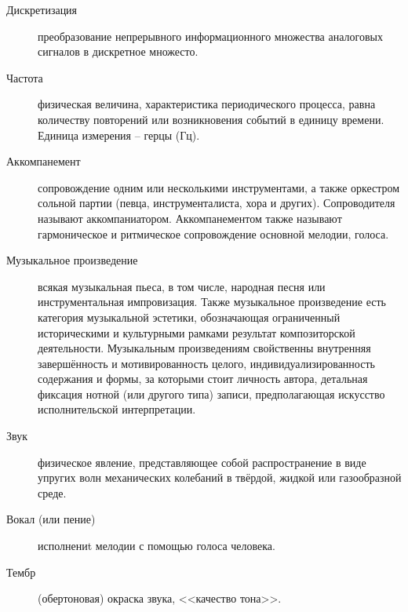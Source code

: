 \Defines %
\begin{description}
\item[Дискретизация] преобразование непрерывного информационного множества аналоговых сигналов в дискретное множесто.
\item[Частота] физическая величина, характеристика периодического процесса, равна количеству повторений или возникновения событий в единицу времени. Единица измерения -- герцы (Гц).
\item[Аккомпанемент] сопровождение одним или несколькими инструментами, а также оркестром сольной партии (певца, инструменталиста, хора и других). Сопроводителя называют аккомпаниатором. Аккомпанементом также называют гармоническое и ритмическое сопровождение основной мелодии, голоса.
\item[Музыкальное произведение] всякая музыкальная пьеса, в том числе, народная песня или инструментальная импровизация. Также музыкальное произведение есть категория музыкальной эстетики, обозначающая ограниченный историческими и культурными рамками результат композиторской деятельности. Музыкальным произведениям свойственны внутренняя завершённость и мотивированность целого, индивидуализированность содержания и формы, за которыми стоит личность автора, детальная фиксация нотной (или другого типа) записи, предполагающая искусство исполнительской интерпретации.
\item[Звук] физическое явление, представляющее собой распространение в виде упругих волн механических колебаний в твёрдой, жидкой или газообразной среде.
\item[Вокал (или пение)] исполнениt мелодии с помощью голоса человека.
\item[Тембр] (обертоновая) окраска звука, <<качество тона>>.
\end{description}

